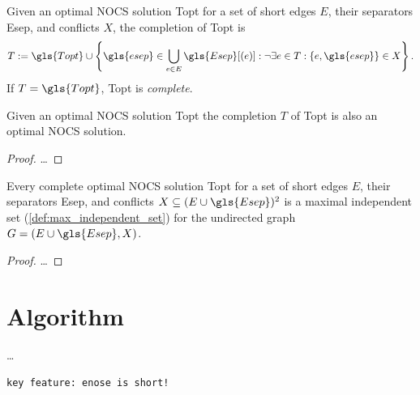
\begin{definition}
  Given an optimal \gls{NOCS} solution \gls{Topt}
  for a set of short edges \(E\), their separators \gls{Esep}, 
  and conflicts \(X\), the completion of \gls{Topt} is
  \[
    T := \gls{Topt} \cup \left\{
      \gls{esep} \in \bigcup\limits_{e \in E} \gls{Esep}[(e)]:
      \lnot\exists e \in T : \{e, \gls{esep}\} \in X
    \right\}.
  \]
  If \(T = \gls{Topt}\), \gls{Topt} is \emph{complete}.
\end{definition}


\begin{theorem}
  Given an optimal \gls{NOCS} solution \gls{Topt} the completion \(T\)
  of \gls{Topt} is also an optimal \gls{NOCS} solution.
\end{theorem}

\begin{proof}
  \ldots{}
\end{proof}

\begin{theorem}
  Every complete optimal \gls{NOCS} solution \gls{Topt} for a set of
  short edges \(E\), their separators \gls{Esep}, and conflicts
  \(X \subseteq (E \cup \gls{Esep})^2\) is a maximal independent set
  (\cref{def:max_independent_set}) for the undirected graph
  \(G = (E \cup \gls{Esep}, X)\).
\end{theorem}

\begin{proof}
  \ldots{}
\end{proof}


\section{Algorithm}
\ldots{}

\verb|key feature: enose is short!|


